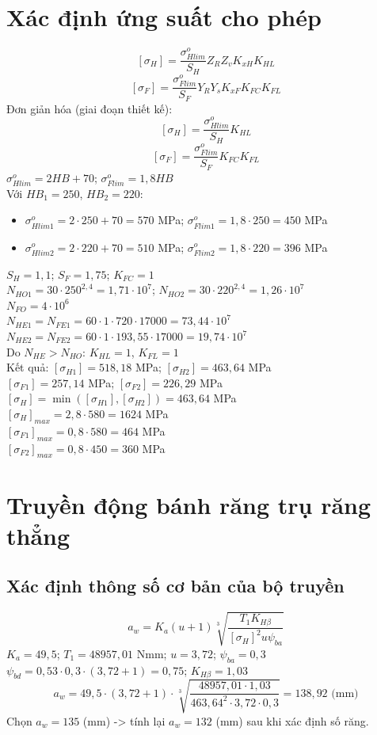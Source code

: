 \documentclass[12pt,a4paper]{report}
\begin{document}
\section{Xác định ứng suất cho phép}
$$[\sigma_H] = \frac{\sigma_{Hlim}^o}{S_H} Z_R Z_v K_{xH} K_{HL}$$
$$[\sigma_F] = \frac{\sigma_{Flim}^o}{S_F} Y_R Y_s K_{xF} K_{FC} K_{FL}$$
Đơn giản hóa (giai đoạn thiết kế):
$$[\sigma_H] = \frac{\sigma_{Hlim}^o}{S_H} K_{HL}$$
$$[\sigma_F] = \frac{\sigma_{Flim}^o}{S_F} K_{FC} K_{FL}$$
$\sigma_{Hlim}^o = 2HB + 70$; $\sigma_{Flim}^o = 1{,}8HB$\\
Với $HB_1 = 250$, $HB_2 = 220$:
\begin{itemize}
    \item $\sigma_{Hlim1}^o = 2 \cdot 250 + 70 = 570$ MPa; $\sigma_{Flim1}^o = 1{,}8 \cdot 250 = 450$ MPa
    \item $\sigma_{Hlim2}^o = 2 \cdot 220 + 70 = 510$ MPa; $\sigma_{Flim2}^o = 1{,}8 \cdot 220 = 396$ MPa
\end{itemize}
$S_H = 1{,}1$; $S_F = 1{,}75$; $K_{FC} = 1$\\
$N_{HO1} = 30 \cdot 250^{2{,}4} = 1{,}71 \cdot 10^7$; $N_{HO2} = 30 \cdot 220^{2{,}4} = 1{,}26 \cdot 10^7$\\
$N_{FO} = 4 \cdot 10^6$\\
$N_{HE1} = N_{FE1} = 60 \cdot 1 \cdot 720 \cdot 17000 = 73{,}44 \cdot 10^7$\\
$N_{HE2} = N_{FE2} = 60 \cdot 1 \cdot 193{,}55 \cdot 17000 = 19{,}74 \cdot 10^7$\\
Do $N_{HE} > N_{HO}$: $K_{HL} = 1$, $K_{FL} = 1$\\
Kết quả:
$[\sigma_{H1}] = 518{,}18$ MPa; $[\sigma_{H2}] = 463{,}64$ MPa\\
$[\sigma_{F1}] = 257{,}14$ MPa; $[\sigma_{F2}] = 226{,}29$ MPa\\
$[\sigma_H] = \min([\sigma_{H1}], [\sigma_{H2}]) = 463{,}64$ MPa\\
$[\sigma_H]_{max} = 2{,}8 \cdot 580 = 1624$ MPa\\
$[\sigma_{F1}]_{max} = 0{,}8 \cdot 580 = 464$ MPa\\
$[\sigma_{F2}]_{max} = 0{,}8 \cdot 450 = 360$ MPa

\section{Truyền động bánh răng trụ răng thẳng}

\subsection{Xác định thông số cơ bản của bộ truyền}
$$a_w = K_a(u+1)\sqrt[3]{\frac{T_1 K_{H\beta}}{[\sigma_H]^2 u \psi_{ba}}}$$
$K_a = 49{,}5$; $T_1 = 48957{,}01$ Nmm; $u = 3{,}72$; $\psi_{ba} = 0{,}3$\\
$\psi_{bd} = 0{,}53 \cdot 0{,}3 \cdot (3{,}72+1) = 0{,}75$; $K_{H\beta} = 1{,}03$
$$a_w = 49{,}5 \cdot (3{,}72+1) \cdot \sqrt[3]{\frac{48957{,}01 \cdot 1{,}03}{463{,}64^2 \cdot 3{,}72 \cdot 0{,}3}} = 138{,}92 \text{ (mm)}$$
Chọn $a_w = 135$ (mm) -> tính lại $a_w = 132$ (mm) sau khi xác định số răng.
\end{document}
